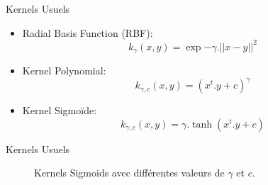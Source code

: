 \documentclass[8pt]{beamer}
\begin{document}
	\begin{frame}{Kernels Usuels}
		\begin{itemize}
			\item  Radial Basis Function (RBF):
			\begin{equation}
				k_{\gamma}(x,y) = \exp{-\gamma.\vert\vert x-y \vert\vert^2}
			\end{equation}
			\item  Kernel Polynomial:
			\begin{equation}
				k_{\gamma, c}(x,y) = (x^t.y + c)^{\gamma}
			\end{equation}
			\item  Kernel Sigmoïde:
			\begin{equation}
				k_{\gamma, c}(x,y) = \gamma.\tanh(x^t.y + c)
			\end{equation}
		\end{itemize}
	\end{frame}

	\begin{frame}[plain]{Kernels Usuels}
		\begin{figure}[H]
			{
				\caption*{}
			}
			{
				\caption*{Kernels Sigmoids avec différentes valeurs de $\gamma$ et $c$.}\label{fig::tanhs}
			}
		\end{figure}
	\end{frame}
\end{document}
